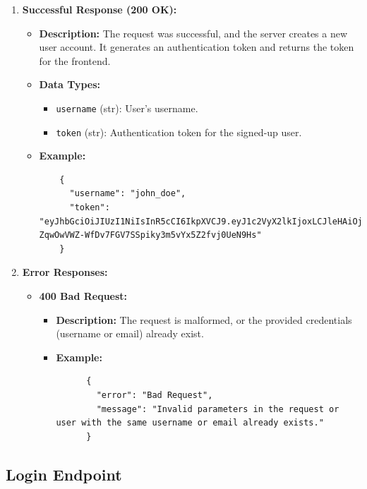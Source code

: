 \documentclass[a4 paper, 12pt]{article}
\begin{document}
\begin{enumerate}
  \item \textbf{Successful Response (200 OK):}
  \begin{itemize}
    \item \textbf{Description:} The request was successful, and the server creates a new user account. It generates an authentication token and returns the token for the frontend.
    \item \textbf{Data Types:}
    \begin{itemize}
      \item \texttt{username} (str): User's username.
      \item \texttt{token} (str): Authentication token for the signed-up user.
    \end{itemize}
    \item \textbf{Example:}
    \begin{verbatim}
    {
      "username": "john_doe",
      "token": "eyJhbGciOiJIUzI1NiIsInR5cCI6IkpXVCJ9.eyJ1c2VyX2lkIjoxLCJleHAiOjE2Mzg5NTM5MDAsImlhdCI6MTYzODk1MzIwMH0.-ZqwOwVWZ-WfDv7FGV7SSpiky3m5vYx5Z2fvj0UeN9Hs"
    }
    \end{verbatim}
  \end{itemize}

  \item \textbf{Error Responses:}
  \begin{itemize}
    \item \textbf{400 Bad Request:}
    \begin{itemize}
      \item \textbf{Description:} The request is malformed, or the provided credentials (username or email) already exist.
      \item \textbf{Example:}
      \begin{verbatim}
      {
        "error": "Bad Request",
        "message": "Invalid parameters in the request or user with the same username or email already exists."
      }
      \end{verbatim}
    \end{itemize}
  \end{itemize}
\end{enumerate}
\subsection{Login Endpoint}
\end{document}
